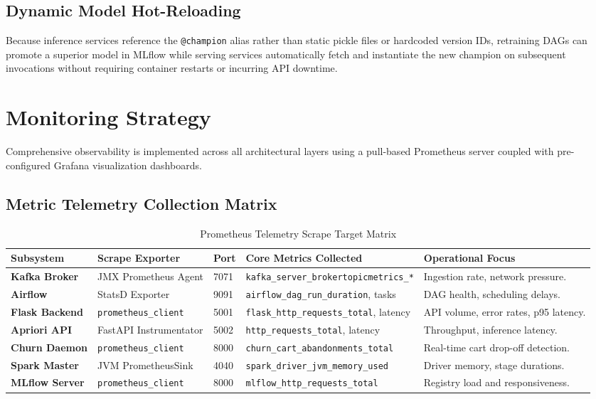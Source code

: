 \documentclass[11pt,a4paper]{article}
\begin{document}
\subsection{Dynamic Model Hot-Reloading}
Because inference services reference the \texttt{@champion} alias rather than static pickle files or hardcoded version IDs, retraining DAGs can promote a superior model in MLflow while serving services automatically fetch and instantiate the new champion on subsequent invocations without requiring container restarts or incurring API downtime.

\section{Monitoring Strategy}

Comprehensive observability is implemented across all architectural layers using a pull-based Prometheus server coupled with pre-configured Grafana visualization dashboards.

\subsection{Metric Telemetry Collection Matrix}

\begin{table}[h]
\centering
\small
\begin{tabularx}{\textwidth}{@{}>{\bfseries}p{3.2cm}p{3.2cm}p{1.0cm}p{4.0cm}X@{}}
\toprule
\color{DeepNavy}Subsystem & \color{DeepNavy}Scrape Exporter & \color{DeepNavy}Port & \color{DeepNavy}Core Metrics Collected & \color{DeepNavy}Operational Focus \\
\midrule
Kafka Broker & JMX Prometheus Agent & 7071 & \texttt{kafka\_server\_brokertopicmetrics\_*} & Ingestion rate, network pressure. \\
Airflow & StatsD Exporter & 9091 & \texttt{airflow\_dag\_run\_duration}, tasks & DAG health, scheduling delays. \\
Flask Backend & \texttt{prometheus\_client} & 5001 & \texttt{flask\_http\_requests\_total}, latency & API volume, error rates, p95 latency. \\
Apriori API & FastAPI Instrumentator & 5002 & \texttt{http\_requests\_total}, latency & Throughput, inference latency. \\
Churn Daemon & \texttt{prometheus\_client} & 8000 & \texttt{churn\_cart\_abandonments\_total} & Real-time cart drop-off detection. \\
Spark Master & JVM PrometheusSink & 4040 & \texttt{spark\_driver\_jvm\_memory\_used} & Driver memory, stage durations. \\
MLflow Server & \texttt{prometheus\_client} & 8000 & \texttt{mlflow\_http\_requests\_total} & Registry load and responsiveness. \\
\bottomrule
\end{tabularx}
\caption{Prometheus Telemetry Scrape Target Matrix}
\end{table}
\end{document}
